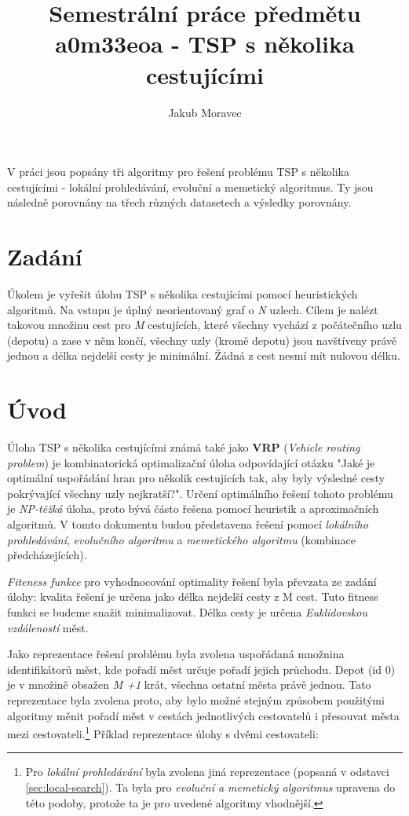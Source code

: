 \documentclass[journal]{IEEEtrancz}
\begin{document}
\title{Semestrální práce předmětu a0m33eoa - TSP s několika cestujícími}
\author{Jakub Moravec}

\maketitle

\begin{abstrakt}
V práci jsou popsány tři algoritmy pro řešení problému TSP s několika cestujícími - lokální prohledávání, evoluční a memetický algoritmus. 
Ty jsou následně porovnány na třech různých datasetech a výsledky porovnány. 
\end{abstrakt}

\IEEEpeerreviewmaketitle

\section{Zadání}
Úkolem je vyřešit úlohu TSP s několika cestujícími pomocí heuristických algoritmů. Na vstupu je úplný neorientovaný graf o \textit{N} uzlech. Cílem je nalézt takovou množinu cest pro \textit{M} cestujících, které všechny vychází z počátečního uzlu (depotu) a zase v něm končí, všechny uzly (kromě depotu) jsou navštíveny právě jednou a délka nejdelší cesty je minimální. Žádná z cest nesmí mít nulovou délku.

\section{Úvod}
Úloha TSP s několika cestujícími známá také jako \textbf{VRP} (\textit{Vehicle routing problem}) je kombinatorická optimalizační úloha odpovídající otázku "Jaké je optimální uspořádání hran pro několik cestujicích tak, aby byly výsledné cesty pokrývající všechny uzly nejkratší?". Určení optimálního řešení tohoto problému je \textit{NP-těžká} úloha, proto bývá částo řešena pomocí heuristik a aproximačních algoritmů. V tomto dokumentu budou představena řešení pomocí \textit{lokálního prohledávání}, \textit{evolučního algoritmu} a \textit{memetického algoritmu} (kombinace předcházejících). 

\textit{Fiteness funkce} pro vyhodnocování optimality řešení byla převzata ze zadání úlohy: kvalita řešení je určena jako délka nejdelší cesty z M cest. Tuto fitness funkci se budeme snažit minimalizovat. Délka cesty je určena \textit{Euklidovskou vzdáleností} měst.

Jako reprezentace řešení problému byla zvolena uspořádaná množnina identifikátorů měst, kde pořadí měst určuje pořadí jejich průchodu. Depot (id 0) je v množině obsažen \textit{M +1} krát, všechna ostatní města právě jednou. Tato reprezentace byla zvolena proto, aby bylo možné stejným způsobem použitými algoritmy měnit pořadí měst v cestách jednotlivých cestovatelů i přesouvat města mezi cestovateli.\footnote{Pro \textit{lokální prohledávání} byla zvolena jiná reprezentace (popsaná v odstavci \ref{sec:local-search}). Ta byla pro \textit{evoluční a memetický algoritmus} upravena do této podoby, protože ta je pro uvedené algoritmy vhodnější.} Příklad reprezentace úlohy s dvěmi cestovateli:
\end{document}
